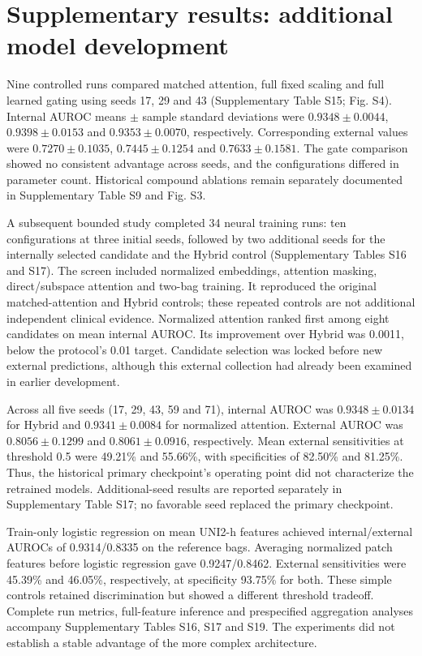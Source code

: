 \section*{Supplementary results: additional model development}

Nine controlled runs compared matched attention, full fixed scaling and full learned gating using seeds 17, 29 and 43 (Supplementary Table S15; Fig. S4). Internal AUROC means $\pm$ sample standard deviations were $0.9348\pm0.0044$, $0.9398\pm0.0153$ and $0.9353\pm0.0070$, respectively. Corresponding external values were $0.7270\pm0.1035$, $0.7445\pm0.1254$ and $0.7633\pm0.1581$. The gate comparison showed no consistent advantage across seeds, and the configurations differed in parameter count. Historical compound ablations remain separately documented in Supplementary Table S9 and Fig. S3.

A subsequent bounded study completed 34 neural training runs: ten configurations at three initial seeds, followed by two additional seeds for the internally selected candidate and the Hybrid control (Supplementary Tables S16 and S17). The screen included normalized embeddings, attention masking, direct/subspace attention and two-bag training. It reproduced the original matched-attention and Hybrid controls; these repeated controls are not additional independent clinical evidence. Normalized attention ranked first among eight candidates on mean internal AUROC. Its improvement over Hybrid was 0.0011, below the protocol's 0.01 target. Candidate selection was locked before new external predictions, although this external collection had already been examined in earlier development.

Across all five seeds (17, 29, 43, 59 and 71), internal AUROC was $0.9348\pm0.0134$ for Hybrid and $0.9341\pm0.0084$ for normalized attention. External AUROC was $0.8056\pm0.1299$ and $0.8061\pm0.0916$, respectively. Mean external sensitivities at threshold 0.5 were 49.21\% and 55.66\%, with specificities of 82.50\% and 81.25\%. Thus, the historical primary checkpoint's operating point did not characterize the retrained models. Additional-seed results are reported separately in Supplementary Table S17; no favorable seed replaced the primary checkpoint.

Train-only logistic regression on mean UNI2-h features achieved internal/external AUROCs of 0.9314/0.8335 on the reference bags. Averaging normalized patch features before logistic regression gave 0.9247/0.8462. External sensitivities were 45.39\% and 46.05\%, respectively, at specificity 93.75\% for both. These simple controls retained discrimination but showed a different threshold tradeoff. Complete run metrics, full-feature inference and prespecified aggregation analyses accompany Supplementary Tables S16, S17 and S19. The experiments did not establish a stable advantage of the more complex architecture.


